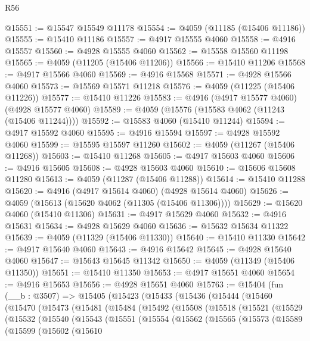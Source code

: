\begin{lexlean}{R56}
\begin{coremodule}
@15551 := @15547 @15549 @11178
@15554 := @4059 (@11185 (@15406 @11186))
@15555 := @15410 @11186
@15557 := @4917 @15555 @4060
@15558 := @4916 @15557
@15560 := @4928 @15555 @4060
@15562 := @15558 @15560 @11198
@15565 := @4059 (@11205 (@15406 @11206))
@15566 := @15410 @11206
@15568 := @4917 @15566 @4060
@15569 := @4916 @15568
@15571 := @4928 @15566 @4060
@15573 := @15569 @15571 @11218
@15576 := @4059 (@11225 (@15406 @11226))
@15577 := @15410 @11226
@15583 := @4916 (@4917 @15577 @4060) (@4928 @15577 @4060)
@15589 := @4059 (@15576 (@15583 @4062 (@11243 (@15406 @11244))))
@15592 := @15583 @4060 (@15410 @11244)
@15594 := @4917 @15592 @4060
@15595 := @4916 @15594
@15597 := @4928 @15592 @4060
@15599 := @15595 @15597 @11260
@15602 := @4059 (@11267 (@15406 @11268))
@15603 := @15410 @11268
@15605 := @4917 @15603 @4060
@15606 := @4916 @15605
@15608 := @4928 @15603 @4060
@15610 := @15606 @15608 @11280
@15613 := @4059 (@11287 (@15406 @11288))
@15614 := @15410 @11288
@15620 := @4916 (@4917 @15614 @4060) (@4928 @15614 @4060)
@15626 := @4059 (@15613 (@15620 @4062 (@11305 (@15406 @11306))))
@15629 := @15620 @4060 (@15410 @11306)
@15631 := @4917 @15629 @4060
@15632 := @4916 @15631
@15634 := @4928 @15629 @4060
@15636 := @15632 @15634 @11322
@15639 := @4059 (@11329 (@15406 @11330))
@15640 := @15410 @11330
@15642 := @4917 @15640 @4060
@15643 := @4916 @15642
@15645 := @4928 @15640 @4060
@15647 := @15643 @15645 @11342
@15650 := @4059 (@11349 (@15406 @11350))
@15651 := @15410 @11350
@15653 := @4917 @15651 @4060
@15654 := @4916 @15653
@15656 := @4928 @15651 @4060
@15763 := @15404
    (fun (__b : @3507) =>
    @15405
      (@15423
        (@15433
          (@15436
            (@15444
              (@15460
                (@15470
                  (@15473
                    (@15481
                      (@15484
                        (@15492
                          (@15508
                            (@15518
                              (@15521
                                (@15529
                                  (@15532
                                    (@15540
                                      (@15543
                                        (@15551
                                          (@15554
                                            (@15562
                                              (@15565
                                                (@15573
                                                  (@15589
                                                    (@15599
                                                      (@15602
                                                        (@15610

\end{coremodule}
\end{lexlean}
